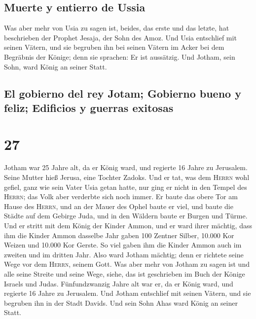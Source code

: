 \hypertarget{muerte-y-entierro-de-ussia}{%
\subsection{Muerte y entierro de
Ussia}\label{muerte-y-entierro-de-ussia}}

 Was aber mehr von Usia zu sagen ist, beides, das erste
und das letzte, hat beschrieben der Prophet Jesaja, der Sohn des Amoz.
 Und Usia entschlief mit seinen Vätern, und sie begruben
ihn bei seinen Vätern im Acker bei dem Begräbnis der Könige; denn sie
sprachen: Er ist aussätzig. Und Jotham, sein Sohn, ward König an seiner
Statt.

\hypertarget{el-gobierno-del-rey-jotam-gobierno-bueno-y-feliz-edificios-y-guerras-exitosas}{%
\subsection{El gobierno del rey Jotam; Gobierno bueno y feliz; Edificios
y guerras
exitosas}\label{el-gobierno-del-rey-jotam-gobierno-bueno-y-feliz-edificios-y-guerras-exitosas}}

\hypertarget{section-26}{%
\section{27}\label{section-26}}

 Jotham war 25 Jahre alt, da er König ward, und regierte
16 Jahre zu Jerusalem. Seine Mutter hieß Jerusa, eine Tochter Zadoks.
 Und er tat, was dem \textsc{Herrn} wohl gefiel, ganz wie
sein Vater Usia getan hatte, nur ging er nicht in den Tempel des
\textsc{Herrn}; das Volk aber verderbte sich noch immer. 
Er baute das obere Tor am Hause des \textsc{Herrn}, und an der Mauer des
Ophel baute er viel,  und baute die Städte auf dem Gebirge
Juda, und in den Wäldern baute er Burgen und Türme.  Und
er stritt mit dem König der Kinder Ammon, und er ward ihrer mächtig,
dass ihm die Kinder Ammon dasselbe Jahr gaben 100 Zentner Silber, 10.000
Kor Weizen und 10.000 Kor Gerste. So viel gaben ihm die Kinder Ammon
auch im zweiten und im dritten Jahr.  Also ward Jotham
mächtig; denn er richtete seine Wege vor dem \textsc{Herrn}, seinem
Gott.  Was aber mehr von Jotham zu sagen ist und alle
seine Streite und seine Wege, siehe, das ist geschrieben im Buch der
Könige Israels und Judas.  Fünfundzwanzig Jahre alt war
er, da er König ward, und regierte 16 Jahre zu Jerusalem. 
Und Jotham entschlief mit seinen Vätern, und sie begruben ihn in der
Stadt Davids. Und sein Sohn Ahas ward König an seiner Statt.

